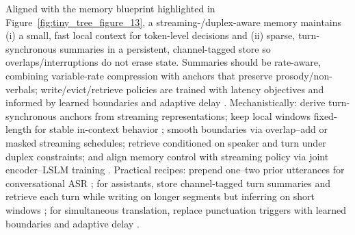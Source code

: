 \documentclass{article}
\begin{document}
Aligned with the memory blueprint highlighted in Figure~\ref{fig:tiny_tree_figure_13}, a streaming-/duplex-aware memory maintains (i) a small, fast local context for token-level decisions and (ii) sparse, turn-synchronous summaries in a persistent, channel-tagged store so overlaps/interruptions do not erase state. Summaries should be rate-aware, combining variable-rate compression with anchors that preserve prosody/non-verbals; write/evict/retrieve policies are trained with latency objectives and informed by learned boundaries and adaptive delay \cite{guo2025streamuniachievingstreamingspeechtransla}. Mechanistically: derive turn-synchronous anchors from streaming representations; keep local windows fixed-length for stable in-context behavior \cite{hsu2024exploringcontextlearningtextlessspeechla}; smooth boundaries via overlap--add or masked streaming schedules; retrieve conditioned on speaker and turn under duplex constraints; and align memory control with streaming policy via joint encoder--LSLM training \cite{guo2025streamuniachievingstreamingspeechtransla}. Practical recipes: prepend one--two prior utterances for conversational ASR \cite{li2025seewossubmissionmlcslmlessonslearnedspee}; for assistants, store channel-tagged turn summaries and retrieve each turn while writing on longer segments but inferring on short windows \cite{nguyen2025qwenvsgemmaintegrationwhispercomparative}; for simultaneous translation, replace punctuation triggers with learned boundaries and adaptive delay \cite{guo2025streamuniachievingstreamingspeechtransla}.
\end{document}
